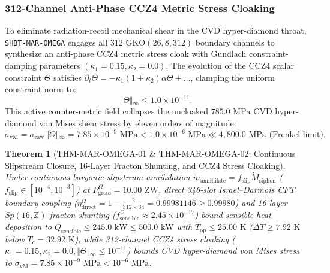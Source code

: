 \documentclass[11pt,onecolumn]{article}
\newtheorem{theorem}{Theorem}
\begin{document}
\subsubsection{312-Channel Anti-Phase CCZ4 Metric Stress Cloaking}
To eliminate radiation-recoil mechanical shear in the CVD hyper-diamond throat, \texttt{SHBT-MAR-OMEGA} engages all $312$ $\text{GKO}(26,8,312)$ boundary channels to synthesize an anti-phase CCZ4 metric stress cloak with Gundlach constraint-damping parameters $(\kappa_1 = 0.15, \kappa_2 = 0.0)$. The evolution of the CCZ4 scalar constraint $\Theta$ satisfies $\partial_t \Theta = -\kappa_1(1 + \kappa_2)\alpha\Theta + \dots$, clamping the uniform constraint norm to:
\begin{equation}
\Vert{}\Theta\Vert{}_\infty \le 1.0 \times 10^{-11}.
\label{eq:mar_omega_theta_bound}
\end{equation}
This active counter-metric field collapses the uncloaked $785.0\text{ MPa}$ CVD hyper-diamond von Mises shear stress by eleven orders of magnitude:
\begin{equation}
\sigma_{\text{vM}} = \sigma_{\text{raw}}\,\Vert{}\Theta\Vert{}_\infty = 7.85 \times 10^{-9}\text{ MPa} < 1.0 \times 10^{-6}\text{ MPa} \ll 4{,}800.0\text{ MPa (Frenkel limit)}.
\label{eq:mar_omega_ccz4_stress_cloak}
\end{equation}

\begin{theorem}[THM-MAR-OMEGA-01 \& THM-MAR-OMEGA-02: Continuous Slipstream Closure, 16-Layer Fracton Shunting, and CCZ4 Stress Cloaking]
\label{thm:mar_omega_01_02}
Under continuous baryonic slipstream annihilation $\dot{m}_{\text{annihilate}} = f_{\text{slip}}\dot{M}_{\text{siphon}}$ ($f_{\text{slip}} \in [10^{-4}, 10^{-3}]$) at $P_{\text{gross}}^{\Omega} = 10.00\text{ ZW}$, direct 346-slot Israel--Darmois CFT boundary coupling ($\eta_{\text{direct}}^{\Omega} = 1 - \frac{2}{312 \times 34} = 0.99981146 \ge 0.99980$) and 16-layer $Sp(16,\mathbb{Z})$ fracton shunting ($f_{\text{sensible}}^{\Omega} \approx 2.45 \times 10^{-17}$) bound sensible heat deposition to $Q_{\text{sensible}} \le 245.0\text{ kW} \le 500.0\text{ kW}$ with $T_{\text{op}} \le 25.00\text{ K}$ ($\Delta T \ge 7.92\text{ K}$ below $T_c = 32.92\text{ K}$), while 312-channel CCZ4 stress cloaking ($\kappa_1 = 0.15, \kappa_2 = 0.0, \Vert{}\Theta\Vert{}_\infty \le 10^{-11}$) bounds CVD hyper-diamond von Mises stress to $\sigma_{\text{vM}} = 7.85 \times 10^{-9}\text{ MPa} < 10^{-6}\text{ MPa}$.
\end{theorem}
\end{document}
